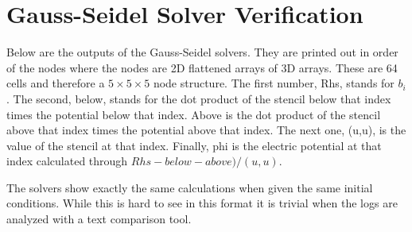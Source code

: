 \chapter{Gauss-Seidel Solver Verification}
\label{app:solvers}

Below are the outputs of the Gauss-Seidel solvers. They are printed out in order of the nodes where the nodes are 2D flattened arrays of 3D arrays. These are 64 cells and therefore a \(5\times5\times5\) node structure. The first number, Rhs, stands for \(b_i\). The second, below, stands for the dot product of the stencil below that index times the potential below that index. Above is the dot product of the stencil above that index times the potential above that index. The next one, (u,u), is the value of the stencil at that index. Finally, phi is the electric potential at that index calculated through \(Rhs-below-above)/(u,u)\). \par

\indent The solvers show exactly the same calculations when given the same initial conditions. While this is hard to see in this format it is trivial when the logs are analyzed with a text comparison tool. \par




